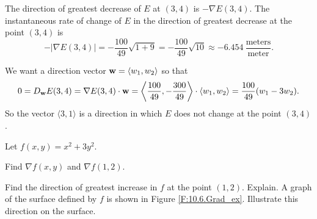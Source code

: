 \begin{exercises}
\begin{exerciseSolution}
\item The direction of greatest decrease of $E$ at $(3,4)$ is $-\nabla E(3,4)$. The instantaneous rate of change of $E$ in the direction of greatest decrease at the point $(3,4)$ is
\[-|\nabla E(3,4)| = -\frac{100}{49}\sqrt{1+9} = -\frac{100}{49}\sqrt{10} \approx -6.454 \ \frac{\text{meters}}{\text{meter}}.\]

\item We want a direction vector $\mathbf{w} = \langle w_1, w_2 \rangle$ so that 
\[0 = D_{\mathbf{w}} E(3,4) = \nabla E(3,4) \cdot \mathbf{w} = \left\langle \frac{100}{49}, -\frac{300}{49} \right\rangle \cdot \langle w_1, w_2 \rangle = \frac{100}{49}(w_1-3w_2).\]
So the vector $\langle 3, 1 \rangle$ is a direction in which $E$ does not change at the point $(3,4)$.
\ea


\end{exerciseSolution}

\item Let $f(x,y) = x^2+3y^2$.
    \ba
    \item Find $\nabla f(x,y)$ and $\nabla f(1,2)$.

    \item Find the direction of greatest increase in $f$ at the point $(1,2)$. Explain. A graph of the surface defined by $f$ is shown in Figure \ref{F:10.6.Grad_ex}. Illustrate this direction on the surface.


\end{exercises}
